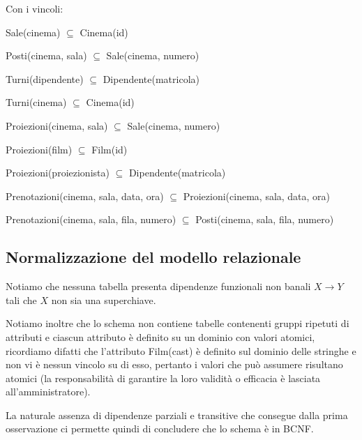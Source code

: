 \quad Con i vincoli:

Sale(cinema) $\subseteq$ Cinema(id)

Posti(cinema, sala) $\subseteq$ Sale(cinema, numero)

Turni(dipendente) $\subseteq$ Dipendente(matricola)

Turni(cinema) $\subseteq$ Cinema(id)

Proiezioni(cinema, sala) $\subseteq$ Sale(cinema, numero)

Proiezioni(film) $\subseteq$ Film(id)

Proiezioni(proiezionista) $\subseteq$ Dipendente(matricola)

Prenotazioni(cinema, sala, data, ora)
$\subseteq$
Proiezioni(cinema, sala, data, ora)

Prenotazioni(cinema, sala, fila, numero)
$\subseteq$
Posti(cinema, sala, fila, numero)

\subsection*{Normalizzazione del modello relazionale}
%
%

Notiamo che nessuna tabella presenta dipendenze funzionali non banali
$X \rightarrow Y$ tali che $X$ non sia una superchiave.

Notiamo inoltre che lo schema non contiene tabelle contenenti gruppi ripetuti
di attributi e ciascun attributo è definito su un dominio con valori atomici,
ricordiamo difatti che l'attributo Film(cast) è definito sul dominio delle
stringhe e non vi è nessun vincolo su di esso, pertanto i valori che può
assumere risultano atomici (la responsabilità di garantire la loro validità o
efficacia è lasciata all'amministratore).

La naturale assenza di dipendenze parziali e transitive che consegue dalla
prima osservazione ci permette quindi di concludere che lo schema è in BCNF.
